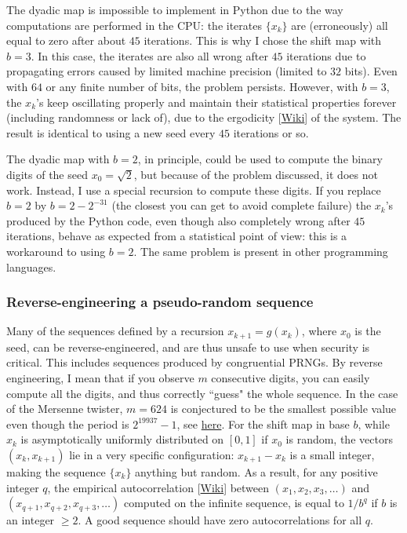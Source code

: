 \documentclass[oneside,10pt]{book}
\begin{document}
\noindent The dyadic map is impossible to implement in Python due to the way computations are performed in the CPU: the iterates
$\{x_k\}$ are (erroneously) all equal to zero after about $45$ iterations. This is why I chose the shift map with $b=3$. In this case, the iterates are also all wrong after $45$ iterations due to propagating errors caused by limited machine precision (limited to $32$ bits). Even with $64$ or any finite number of bits, the problem persists.  However, with $b=3$, the $x_k$'s keep oscillating properly and maintain their statistical properties forever (including randomness or lack of), due to the \textcolor{index}{ergodicity}
 [\href{https://en.wikipedia.org/wiki/Ergodicity}{Wiki}] of the system. The result is identical to using a new seed every $45$ iterations or so.

The dyadic map with $b=2$, in principle, could be used to compute the binary digits of the seed
$x_0=\sqrt{2}$, but because of the problem discussed, it does not work. Instead, I use a special recursion to compute these digits. If you replace $b=2$ by $b=2-2^{-31}$ (the closest you can get to avoid complete failure) the $x_k$'s produced by the Python code,  even though also completely wrong after $45$ iterations, behave as expected from a statistical point of view: this is a workaround to  using $b=2$. The same problem is present in other programming languages.

\subsubsection{Reverse-engineering a pseudo-random sequence}

Many of the sequences defined by a recursion $x_{k+1}=g(x_k)$, where $x_0$ is the seed, can be reverse-engineered, and are thus
 unsafe to use when security is critical. This includes sequences produced by congruential PRNGs. By reverse engineering, I mean that if you observe $m$ consecutive digits, you can easily compute all the digits, and thus correctly ``guess" the whole sequence. In the case of the Mersenne twister, $m=624$ is conjectured to be the smallest possible value even though the period is $2^{\num{19937}}-1$, see \href{https://en.wikipedia.org/wiki/Mersenne_Twister}{here}. For the shift map in base $b$, while $x_k$ is asymptotically uniformly distributed on $[0, 1]$ if $x_0$ is random, the vectors $(x_k,x_{k+1})$ lie in a very specific configuration: $x_{k+1}-x_k$ is a small integer, making the sequence $\{x_k\}$ anything but random. As a result, for any positive integer $q$, the empirical \textcolor{index}{autocorrelation}
 [\href{https://en.wikipedia.org/wiki/Autocorrelation}{Wiki}] between $(x_1, x_2,x_3,\dots)$
and $(x_{q+1}, x_{q+2},x_{q+3},\dots)$ computed on the infinite sequence, is equal to $1/b^q$ if $b$ is an integer $\geq 2$.
 A good sequence should have zero autocorrelations for all $q$.
\end{document}
